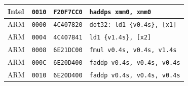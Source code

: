 \begin{table}[htbp]
\begin{tabular}{@{}l|l|l|p{7.2cm}@{}}
Intel & \texttt{0010} & \texttt{F20F7CC0} & \texttt{haddps xmm0, xmm0} \\
\midrule
ARM & \texttt{0000} & \texttt{4C407820} & \texttt{dot32: ld1 \{v0.4s\}, [x1]} \\
ARM & \texttt{0004} & \texttt{4C407841} & \texttt{ld1 \{v1.4s\}, [x2]} \\
ARM & \texttt{0008} & \texttt{6E21DC00} & \texttt{fmul v0.4s, v0.4s, v1.4s} \\
ARM & \texttt{000C} & \texttt{6E20D400} & \texttt{faddp v0.4s, v0.4s, v0.4s} \\
ARM & \texttt{0010} & \texttt{6E20D400} & \texttt{faddp v0.4s, v0.4s, v0.4s} \\
\bottomrule
\end{tabular}
\endgroup
\end{table}
\noindent{}\par

